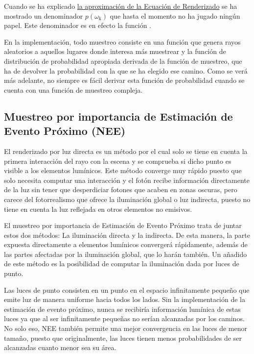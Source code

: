 Cuando se ha explicado \hyperref[subsec:montecarlo]{la aproximación de la Ecuación de Renderizado} se ha mostrado un denominador $p(\omega _{\text{k}})$ que hasta el momento no ha jugado ningún papel. Este denominador es en efecto la función .

En la implementación, todo muestreo consiste en una función que genera rayos aleatorios a aquellos lugares donde interesa más muestrear  y la función de distribución de probabilidad apropiada  derivada de la función de muestreo, que ha de devolver la probabilidad con la que se ha elegido ese camino. Como se verá más adelante, no siempre es fácil derivar esta función de probabilidad cuando se cuenta con una función de muestreo compleja.


\subsection{Muestreo por importancia de Estimación de Evento Próximo (NEE)}
\label{sub:nee}

El renderizado por luz directa es un método por el cual solo se tiene en cuenta la primera interacción del rayo con la escena y se comprueba si dicho punto es visible a los elementos lumínicos. Este método converge muy rápido puesto que solo necesita computar una interacción y el fotón recibe información directamente de la luz sin tener que desperdiciar fotones que acaben en zonas oscuras, pero carece del fotorrealismo que ofrece la iluminación global o luz indirecta, puesto no tiene en cuenta la luz reflejada en otros elementos no emisivos.

El muestreo por importancia de Estimación de Evento Próximo trata de juntar estos dos métodos: La iluminación directa y la indirecta. De esta manera, la parte expuesta directamente a elementos lumínicos convergerá rápidamente, además de las partes afectadas por la iluminación global, que lo harán también. Un añadido de este método es la posibilidad de computar la iluminación dada por luces de punto.

Las luces de punto consisten en un punto en el espacio infinitamente pequeño que emite luz de manera uniforme hacia todos los lados. Sin la implementación de la estimación de evento próximo, nunca se recibiría información lumínica de estas luces ya que al ser infinitamente pequeñas no serían alcanzadas por los caminos. No solo eso, NEE también permite una mejor convergencia en las luces de menor tamaño, puesto que originalmente, las luces tienen menos probabilidades de ser alcanzadas cuanto menor sea su área.


